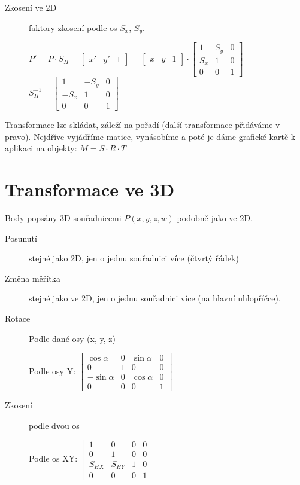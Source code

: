 \documentclass[a4paper, 11pt]{report}
\begin{document}
\begin{description}
	\item[Zkosení ve 2D] faktory zkosení podle os $S_x$, $S_y$.
	
	$P' = P \cdot S_H = \begin{bmatrix} x' & y' & 1 \end{bmatrix} = \begin{bmatrix} x & y & 1 \end{bmatrix}
	\cdot \begin{bmatrix}
		1 & S_y & 0 \\
		S_x & 1 & 0 \\
		0 & 0 & 1
	\end{bmatrix}$
	\hfill
	$S_H^{-1} = \begin{bmatrix}
		1 & -S_y & 0 \\
		-S_x & 1 & 0 \\
		0 & 0 & 1
	\end{bmatrix}$
\end{description}

Transformace lze skládat, záleží na pořadí (další transformace přidáváme v pravo). Nejdříve vyjádříme matice, vynásobíme a poté je dáme grafické kartě k aplikaci na objekty: $M = S \cdot R \cdot T$

\section{Transformace ve 3D} Body popsány 3D souřadnicemi $P(x,y,z,w)$ podobně jako ve 2D.

\begin{description}
	\item[Posunutí] stejné jako 2D, jen o jednu souřadnici více (čtvrtý řádek)
	\item[Změna měřítka] stejné jako ve 2D, jen o jednu souřadnici více (na hlavní uhlopříčce).
	\item[Rotace] Podle dané osy (x, y, z)
	
	Podle osy Y: $\begin{bmatrix}
		\cos{\alpha} & 0 & \sin{\alpha} & 0 \\
		0 & 1 & 0 & 0 \\
		-\sin{\alpha} & 0 & \cos{\alpha} & 0 \\
		0 & 0 & 0 & 1
	\end{bmatrix}$
	
	\item[Zkosení] podle dvou os
	
	Podle os XY: $\begin{bmatrix}
		1 & 0 & 0 & 0 \\
		0 & 1 & 0 & 0 \\
		S_{HX} & S_{HY} & 1 & 0 \\
		0 & 0 & 0 & 1
	\end{bmatrix}$
\end{description}
\end{document}
